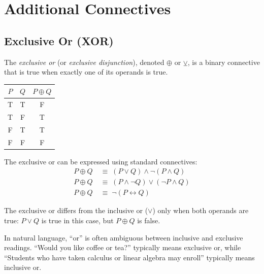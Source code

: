 
\section{Additional Connectives}

\subsection{Exclusive Or (XOR)}

\begin{definition}[Exclusive Or]
The \emph{exclusive or} (or \emph{exclusive disjunction}), denoted $\oplus$ or
$\veebar$, is a binary connective that is true when exactly one of its operands
is true.

\begin{center}
\renewcommand{\arraystretch}{1.2}
\begin{tabular}{|c|c||c|}
\hline
$P$ & $Q$ & $P \oplus Q$ \\
\hline
T & T & F \\
T & F & T \\
F & T & T \\
F & F & F \\
\hline
\end{tabular}
\end{center}
\end{definition}

\begin{theorem}
The exclusive or can be expressed using standard connectives:
\begin{align*}
P \oplus Q &\;\equiv\; (P \vee Q) \wedge \neg(P \wedge Q) \\
P \oplus Q &\;\equiv\; (P \wedge \neg Q) \vee (\neg P \wedge Q) \\
P \oplus Q &\;\equiv\; \neg(P \leftrightarrow Q)
\end{align*}
\end{theorem}

\begin{remark}
The exclusive or differs from the inclusive or ($\vee$) only when both operands
are true: $P \vee Q$ is true in this case, but $P \oplus Q$ is false.

In natural language, ``or'' is often ambiguous between inclusive and exclusive
readings. ``Would you like coffee or tea?'' typically means exclusive or, while
``Students who have taken calculus or linear algebra may enroll'' typically
means inclusive or.
\end{remark}

